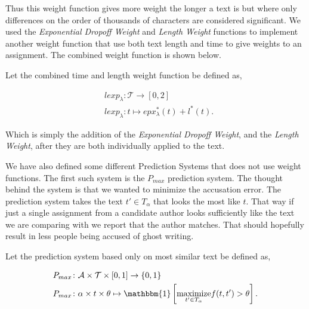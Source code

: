 Thus this weight function gives more weight the longer a text is but where only
differences on the order of thousands of characters are considered significant.
We used the \textit{Exponential Dropoff Weight} and \textit{Length Weight}
functions to implement another weight function that use both text length and
time to give weights to an assignment. The combined weight function is shown
below.

\begin{definition}

    Let the combined time and length weight function be defined as,

    \begin{align}
        &lexp_\lambda \colon \mathcal{T} \rightarrow [0, 2] \\
        &lexp_\lambda \colon t \mapsto epx^*_\lambda(t) + l^*(t).
    \end{align}

\end{definition}

Which is simply the addition of the \textit{Exponential Dropoff Weight}, and the
\textit{Length Weight}, after they are both individually applied to the text.

We have also defined some different Prediction Systems that does not use weight
functions. The first such system is the $P_{max}$ prediction system. The thought
behind the system is that we wanted to minimize the accusation error. The
prediction system takes the text $t' \in T_\alpha$ that looks the most like $t$.
That way if just a single assignment from a candidate author looks sufficiently
like the text we are comparing with we report that the author matches. That
should hopefully result in less people being accused of ghost writing.

\begin{definition}
    \label{def:maximum_prediction_system}

    Let the prediction system based only on most similar text be defined as,

    \begin{align}
        &P_{max} \colon \mathcal{A} \times \mathcal{T} \times [0, 1] \rightarrow
            \{0, 1\} \\
        &P_{max} \colon \alpha \times t \times \theta \mapsto \mathbbm{1}\left[
                \underset{t' \in T_\alpha}{\text{maximize}} f(t, t') > \theta
            \right].
    \end{align}

\end{definition}

